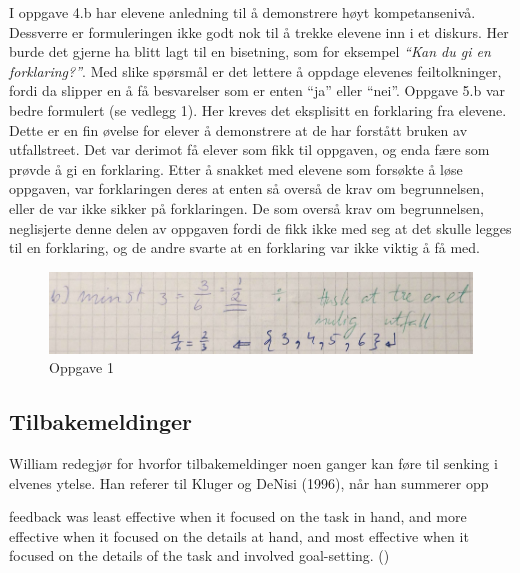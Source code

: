 \documentclass[main.tex]{subfiles}
\begin{document}
I oppgave 4.b har elevene anledning til å demonstrere høyt kompetansenivå. Dessverre er formuleringen ikke
godt nok til å trekke elevene inn i et diskurs. Her burde det gjerne ha blitt lagt til en bisetning, som 
for eksempel \emph{``Kan du gi en forklaring?''}. Med slike spørsmål er det lettere å oppdage elevenes
feiltolkninger, fordi da slipper en å få besvarelser som er enten ``ja'' eller ``nei''. Oppgave 
5.b var bedre formulert (se vedlegg 1). Her kreves det eksplisitt en forklaring fra elevene.
Dette er en fin øvelse for elever å demonstrere at de har forstått bruken av utfallstreet. Det var derimot
få elever som fikk til oppgaven, og enda fære som prøvde å gi en forklaring. Etter å snakket med elevene
som forsøkte å løse oppgaven, var forklaringen deres at enten så overså de krav om begrunnelsen, eller de var
ikke sikker på forklaringen. De som overså krav om begrunnelsen, neglisjerte denne delen av oppgaven fordi
de fikk ikke med seg at det skulle legges til en forklaring, og de andre svarte at en forklaring var ikke
viktig å få med.

\begin{figure}[h]
\centering
\includegraphics[scale = 0.4]{../figures/maryam.png}
\caption{Oppgave 1}
\label{fig:maryam}
\end{figure}



\subsection*{Tilbakemeldinger}

William redegjør for hvorfor tilbakemeldinger noen ganger kan føre til senking 
i elvenes ytelse. Han referer til Kluger og DeNisi (1996), når han summerer opp 
\begin{displayquote}
\textelp{} feedback was least effective when it focused on the task in hand, 
and more effective when it focused on the details at hand, and most effective 
when it focused on the details of the task and involved goal-setting.
()
\end{displayquote}
\end{document}
